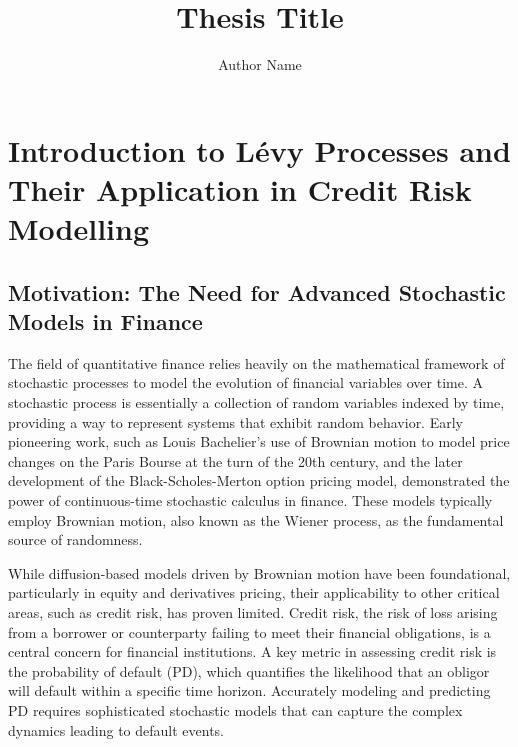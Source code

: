 \documentclass[11pt,twoside,openright]{report}
\title{Thesis Title}
\author{Author Name}
\date{\the\year{}}
\begin{document}
\doublespacing



\maketitle








\chapter{Introduction to Lévy Processes and Their Application in Credit Risk Modelling}
\label{chap:intro_levy_credit}

\section{Motivation: The Need for Advanced Stochastic Models in Finance}
\label{sec:motivation}

The field of quantitative finance relies heavily on the mathematical framework of stochastic processes to model the evolution of financial variables over time. A stochastic process is essentially a collection of random variables indexed by time, providing a way to represent systems that exhibit random behavior. Early pioneering work, such as Louis Bachelier's use of Brownian motion to model price changes on the Paris Bourse at the turn of the 20th century, and the later development of the Black-Scholes-Merton option pricing model, demonstrated the power of continuous-time stochastic calculus in finance. These models typically employ Brownian motion, also known as the Wiener process, as the fundamental source of randomness.

While diffusion-based models driven by Brownian motion have been foundational, particularly in equity and derivatives pricing, their applicability to other critical areas, such as credit risk, has proven limited. Credit risk, the risk of loss arising from a borrower or counterparty failing to meet their financial obligations, is a central concern for financial institutions. A key metric in assessing credit risk is the probability of default (PD), which quantifies the likelihood that an obligor will default within a specific time horizon. Accurately modeling and predicting PD requires sophisticated stochastic models that can capture the complex dynamics leading to default events.
\end{document}
